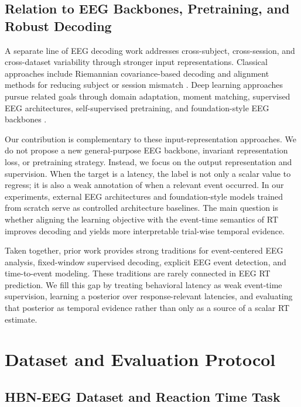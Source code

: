 \documentclass[12pt]{article}
\begin{document}
\subsection{Relation to EEG Backbones, Pretraining, and Robust Decoding}
A separate line of EEG decoding work addresses cross-subject, cross-session, and cross-dataset variability through stronger input representations. Classical approaches include Riemannian covariance-based decoding and alignment methods for reducing subject or session mismatch \citep{Barachant2012RiemannianBCI,Jayaram2016TransferLearningBCI,Zanini2018RiemannianTL,HeWu2020EuclideanAlignment}. Deep learning approaches pursue related goals through domain adaptation, moment matching, supervised EEG architectures, self-supervised pretraining, and foundation-style EEG backbones \citep{Ganin2016DANN,SunSaenko2016DeepCORAL,Kostas2021BENDR,wang2024eegpt,Jiang2024LaBraM,Chen2024EEGFormer,Wang2025EEGMamba,ElOuahidi2025REVE,Yue2024BrainGPT}.

Our contribution is complementary to these input-representation approaches. We do not propose a new general-purpose EEG backbone, invariant representation loss, or pretraining strategy. Instead, we focus on the output representation and supervision. When the target is a latency, the label is not only a scalar value to regress; it is also a weak annotation of when a relevant event occurred. In our experiments, external EEG architectures and foundation-style models trained from scratch serve as controlled architecture baselines. The main question is whether aligning the learning objective with the event-time semantics of RT improves decoding and yields more interpretable trial-wise temporal evidence.

Taken together, prior work provides strong traditions for event-centered EEG analysis, fixed-window supervised decoding, explicit EEG event detection, and time-to-event modeling. These traditions are rarely connected in EEG RT prediction. We fill this gap by treating behavioral latency as weak event-time supervision, learning a posterior over response-relevant latencies, and evaluating that posterior as temporal evidence rather than only as a source of a scalar RT estimate.


\section{Dataset and Evaluation Protocol}

\subsection{HBN-EEG Dataset and Reaction Time Task}
\end{document}
